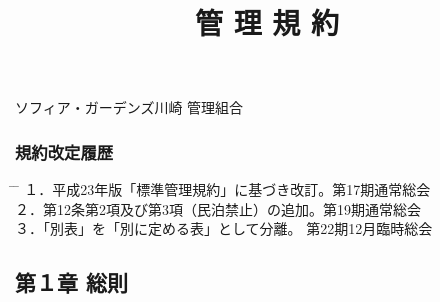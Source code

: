 \documentclass[12pt,uplatex]{jsarticle}
\title{管 理 規 約}
\begin{document}
\date{}
\maketitle
\begin{center}
  \vspace{\baselineskip}
  \vspace{\baselineskip}
  \vspace{\baselineskip}
  \vspace{\baselineskip}
  \vspace{\baselineskip}
  \vspace{\baselineskip}
  \vspace{\baselineskip}
  \vspace{\baselineskip}
  \vspace{\baselineskip}
  \vspace{\baselineskip}
  \vspace{\baselineskip}
  \vspace{\baselineskip}
  \vspace{\baselineskip}
  \vspace{\baselineskip}
  \vspace{\baselineskip}
  \vspace{\baselineskip}
  \vspace{\baselineskip}
  \vspace{\baselineskip}
  \vspace{\baselineskip}
  \vspace{\baselineskip}
  \vspace{\baselineskip}
  \vspace{\baselineskip}
  {\Large ソフィア・ガーデンズ川崎 管理組合}
\end{center}
\vspace{\baselineskip}
\vspace{\baselineskip}
  \subsubsection*{ 規約改定履歴 }
  \vspace{\baselineskip}
  \begin{tabbing}
    \hspace{5mm} \= \hspace{80mm} \= \hspace{100mm} \kill
    １．\>平成23年版「標準管理規約」に基づき改訂。\>第17期通常総会\\
    ２．\>第12条第2項及び第3項（民泊禁止）の追加。\>第19期通常総会\\
    ３．\>「別表」を「別に定める表」として分離。 \>第22期12月臨時総会\\
  \end{tabbing}
\clearpage
\tableofcontents
\clearpage
\addtocounter{page}{-4}
\pagestyle{plain}
\begin{center}
\subsection*{第１章 総則}
\end{center}
\end{document}
